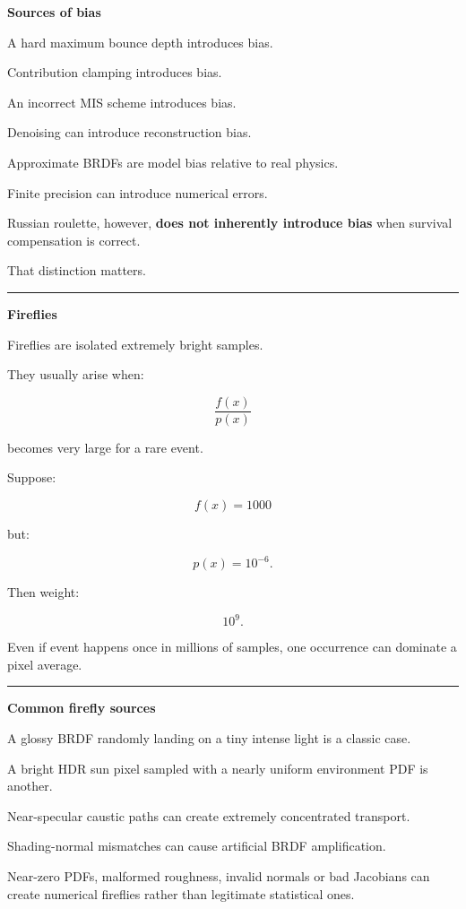 \textbf{Sources of bias}

A hard maximum bounce depth introduces bias.

Contribution clamping introduces bias.

An incorrect MIS scheme introduces bias.

Denoising can introduce reconstruction bias.

Approximate BRDFs are model bias relative to real physics.

Finite precision can introduce numerical errors.

Russian roulette, however, \textbf{does not inherently introduce bias} when survival compensation is correct.

That distinction matters.

\begin{center}\rule{0.5\linewidth}{0.5pt}\end{center}

\textbf{Fireflies}

Fireflies are isolated extremely bright samples.

They usually arise when:

\[
\boxed{
\frac{f(x)}{p(x)}
}
\]

becomes very large for a rare event.

Suppose:

\[
f(x)=1000
\]

but:

\[
p(x)=10^{-6}.
\]

Then weight:

\[
10^9.
\]

Even if event happens once in millions of samples, one occurrence can dominate a pixel average.

\begin{center}\rule{0.5\linewidth}{0.5pt}\end{center}

\textbf{Common firefly sources}

A glossy BRDF randomly landing on a tiny intense light is a classic case.

A bright HDR sun pixel sampled with a nearly uniform environment PDF is another.

Near-specular caustic paths can create extremely concentrated transport.

Shading-normal mismatches can cause artificial BRDF amplification.

Near-zero PDFs, malformed roughness, invalid normals or bad Jacobians can create numerical fireflies rather than legitimate statistical ones.

